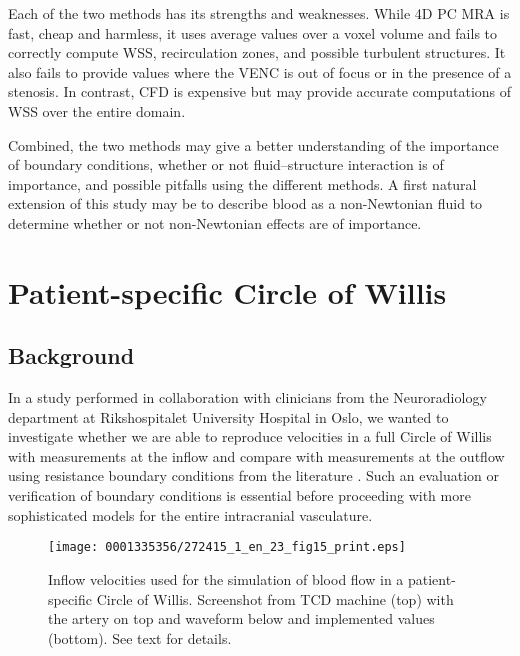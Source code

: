Each of the two methods has its strengths and weaknesses. While 4D PC
MRA is fast, cheap and harmless, it uses average values over a voxel
volume and fails to correctly compute WSS, recirculation zones, and
possible turbulent structures. It also fails to provide values where
the VENC is out of focus or in the presence of a stenosis. In
contrast, CFD is expensive but may provide accurate computations of
WSS over the entire domain.

Combined, the two methods may give a better understanding of the
importance of boundary conditions, whether or not fluid--structure
interaction is of importance, and possible pitfalls using the
different methods. A first natural extension of this study may be to
describe blood as a non-Newtonian fluid to determine whether or not
non-Newtonian effects are of importance.

\section{Patient-specific Circle of Willis} \label{cok}

\subsection{Background}

In a study performed in collaboration with clinicians from the
Neuroradiology department at Riks\-hospitalet University Hospital in
Oslo, we wanted to investigate whether we are able to reproduce
velocities in a full Circle of Willis with measurements at the inflow
and compare with measurements at the outflow using resistance boundary
conditions from the
literature \citep{AlastrueyParkerPeiroEtAl2007,Vignon-ClementelFigueroaJansenEtAl2006}.
Such an evaluation or verification of boundary conditions is essential
before proceeding with more sophisticated models for the entire
intracranial vasculature.

\begin{figure}[!t]
\centering
\texttt{[image: 0001335356/272415\_1\_en\_23\_fig15\_print.eps]}
\caption{Inflow velocities used for the simulation of blood flow in
    a patient-specific Circle of Willis. Screenshot from TCD machine
    (top) with the artery on top and waveform below and implemented
    values (bottom). See text for details.}\label{fig:kvs-2:cok_inflow}\vspace*{6pt}
\end{figure}

